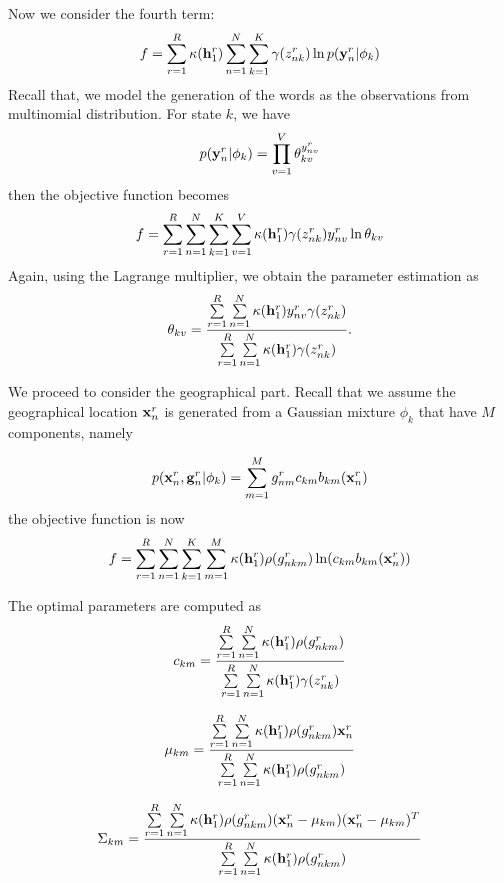 
Now we consider the fourth term:
$$
f = \sum\limits_{r=1}^R \kappa(\mathbf{h}^r_1) \sum\limits_{n=1}^N \sum\limits_{k=1}^K \gamma(z_{nk}^r) \ln p(\mathbf{y}_n^r | \phi_k)
$$
Recall that, we model the generation of the words
as the observations from multinomial distribution. For state 
$k$, we have
$$
p(\mathbf{y}_n^r | \phi_k) = \prod\limits_{v=1}^V \theta_{kv}^{y_{nv}^r}
$$
then the objective function becomes
$$
f = \sum\limits_{r=1}^R \sum\limits_{n=1}^N \sum\limits_{k=1}^K \sum\limits_{v=1}^V
\kappa(\mathbf{h}^r_1)\gamma(z_{nk}^r) y_{nv}^r \ln \theta_{kv}
$$
Again, using the Lagrange multiplier, we obtain the parameter estimation as
$$
\theta_{kv} = \frac{\sum\limits_{r=1}^R  \sum\limits_{n=1}^N \kappa(\mathbf{h}^r_1) y_{nv}^r \gamma(z_{nk}^r)}
{\sum\limits_{r=1}^R  \sum\limits_{n=1}^N \kappa(\mathbf{h}^r_1) \gamma(z_{nk}^r)}.
$$




We proceed to consider the geographical part. Recall that we assume the
geographical location $\mathbf{x}_n^r$ is generated from a Gaussian mixture $\phi_k$
that have $M$ components, namely

$$
p(\mathbf{x}_n^r, \mathbf{g}_n^r | \phi_k) = \sum\limits_{m=1}^M g_{nm}^r c_{km} b_{km}(\mathbf{x}_n^r)
$$
the objective function is now
$$
f = \sum\limits_{r=1}^R \sum\limits_{n=1}^N \sum\limits_{k=1}^K \sum\limits_{m=1}^M 
\kappa(\mathbf{h}^r_1) \rho(g_{nkm}^r) \ln(c_{km} b_{km}(\mathbf{x}_n^r))
$$

The optimal parameters are computed as
$$
c_{km} =  \frac{\sum\limits_{r=1}^R  \sum\limits_{n=1}^N \kappa(\mathbf{h}^r_1) \rho(g_{nkm}^r)}
  {\sum\limits_{r=1}^R  \sum\limits_{n=1}^N \kappa(\mathbf{h}^r_1) \gamma(z_{nk}^r)}
$$

$$
  \mu_{km} = \frac{\sum\limits_{r=1}^R  \sum\limits_{n=1}^N \kappa(\mathbf{h}^r_1) \rho(g_{nkm}^r) \mathbf{x}_n^r}
  {\sum\limits_{r=1}^R  \sum\limits_{n=1}^N \kappa(\mathbf{h}^r_1) \rho(g_{nkm}^r)}
$$

$$
  \Sigma_{km} =
  \frac{\sum\limits_{r=1}^R \sum\limits_{n=1}^N \kappa(\mathbf{h}^r_1) \rho(g_{nkm}^r) (\mathbf{x}_n^r - \mu_{km}) (\mathbf{x}_n^r - \mu_{km})^T }
  {\sum\limits_{r=1}^R  \sum\limits_{n=1}^N \kappa(\mathbf{h}^r_1) \rho(g_{nkm}^r)}
$$

